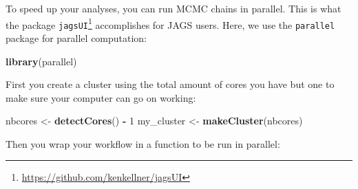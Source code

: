 \documentclass[
  12pt,
]{krantz}
\newenvironment{Shaded}{\begin{snugshade}}{\end{snugshade}}
\newcommand{\DecValTok}[1]{\textcolor[rgb]{0.00,0.00,0.81}{#1}}
\newcommand{\FunctionTok}[1]{\textcolor[rgb]{0.13,0.29,0.53}{\textbf{#1}}}
\newcommand{\NormalTok}[1]{#1}
\newcommand{\OtherTok}[1]{\textcolor[rgb]{0.56,0.35,0.01}{#1}}
\newcommand{\SpecialCharTok}[1]{\textcolor[rgb]{0.81,0.36,0.00}{\textbf{#1}}}
\begin{document}
To speed up your analyses, you can run MCMC chains in parallel. This is what the package \texttt{jagsUI}\footnote{\url{https://github.com/kenkellner/jagsUI}} accomplishes for JAGS users. Here, we use the \texttt{parallel} package for parallel computation:

\begin{Shaded}
\begin{Highlighting}[]
\FunctionTok{library}\NormalTok{(parallel)}
\end{Highlighting}
\end{Shaded}

First you create a cluster using the total amount of cores you have but one to make sure your computer can go on working:

\begin{Shaded}
\begin{Highlighting}[]
\NormalTok{nbcores }\OtherTok{\textless{}{-}} \FunctionTok{detectCores}\NormalTok{() }\SpecialCharTok{{-}} \DecValTok{1}
\NormalTok{my\_cluster }\OtherTok{\textless{}{-}} \FunctionTok{makeCluster}\NormalTok{(nbcores)}
\end{Highlighting}
\end{Shaded}

Then you wrap your workflow in a function to be run in parallel:
\end{document}

